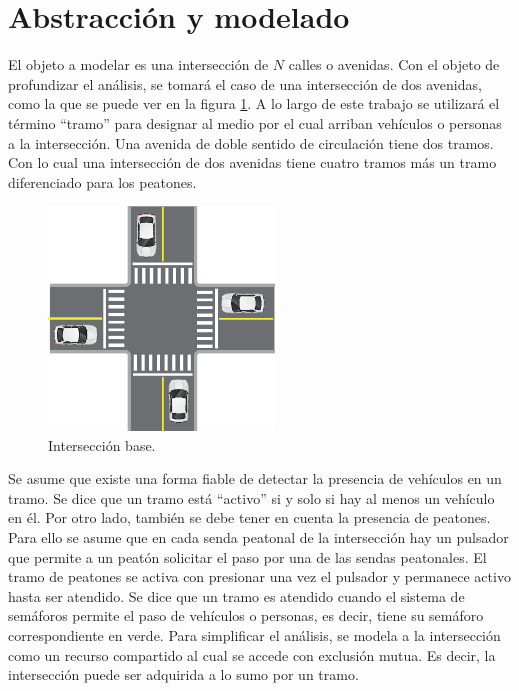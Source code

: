 \lstset {
tabsize=2,
basicstyle=\footnotesize\ttfamily,breaklines=true
}

\section{Abstracción y modelado}
	El objeto a modelar es una intersección de $N$ calles o avenidas. Con el objeto de profundizar el análisis, se tomará el caso de una intersección de dos avenidas, como la que se puede ver en la figura \ref{fig:interseccion-base}. A lo largo de este trabajo se utilizará el término \enquote{tramo} para designar al medio por el cual arriban vehículos o personas a la intersección. Una avenida de doble sentido de circulación tiene dos tramos. Con lo cual una intersección de dos avenidas tiene cuatro tramos más un tramo diferenciado para los peatones. \begin{figure}[htbp] \centering \includegraphics[width=6cm]{imagenes/interseccion-base.eps} \caption{Intersección base.} \label{fig:interseccion-base} \end{figure} Se asume que existe una forma fiable de detectar la presencia de vehículos en un tramo. Se dice que un tramo está \enquote{activo} si y solo si hay al menos un vehículo en él. Por otro lado, también se debe tener en cuenta la presencia de peatones. Para ello se asume que en cada senda peatonal de la intersección hay un pulsador que permite a un peatón solicitar el paso por una de las sendas peatonales. El tramo de peatones se activa con presionar una vez el pulsador y permanece activo hasta ser atendido. Se dice que un tramo es atendido cuando el sistema de semáforos permite el paso de vehículos o personas, es decir, tiene su semáforo correspondiente en verde. Para simplificar el análisis, se modela a la intersección como un recurso compartido al cual se accede con exclusión mutua.
	Es decir, la intersección puede ser adquirida a lo sumo por un tramo.




